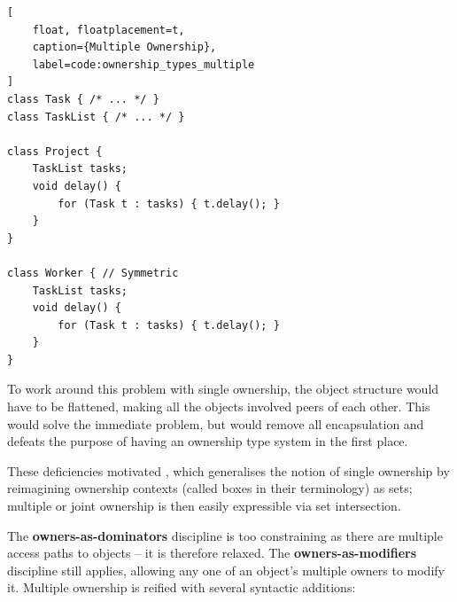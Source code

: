 \documentclass{acm_proc_article-sp}
\begin{document}
\begin{lstlisting}[
	float, floatplacement=t,
	caption={Multiple Ownership},
	label=code:ownership_types_multiple
]
class Task { /* ... */ }
class TaskList { /* ... */ }

class Project {
	TaskList tasks;
	void delay() {
		for (Task t : tasks) { t.delay(); }
	}
}

class Worker { // Symmetric
	TaskList tasks;
	void delay() {
		for (Task t : tasks) { t.delay(); }
	}
}
\end{lstlisting}

To work around this problem with single ownership, the object structure would
have to be flattened, making all the objects involved peers of each other. This
would solve the immediate problem, but would remove all encapsulation and
defeats the purpose of having an ownership type system in the first place.

These deficiencies motivated \cite{cameron07mojo}, which generalises the notion
of single ownership by reimagining ownership contexts (called boxes in their
terminology) as sets; multiple or joint ownership is then easily expressible via
set intersection.

The \textbf{owners-as-dominators} discipline is too constraining as there are
multiple access paths to objects -- it is therefore relaxed. The
\textbf{owners-as-modifiers} discipline still applies, allowing any one
of an object's multiple owners to modify it. Multiple ownership is reified with
several syntactic additions:
\end{document}
